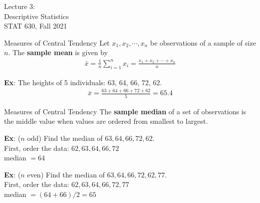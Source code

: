 \documentclass{beamer}
\begin{document}
\begin{frame}
\large
Lecture 3:\\
Descriptive Statistics\\
STAT 630, Fall 2021
\normalsize
\end{frame}

\begin{frame}{Measures of Central Tendency}
Let $x_1, x_2, \cdots, x_n$ be observations of a sample of size $n$.  The \textbf{sample mean} is given by 
\begin{align*}
\bar{x} = \frac{1}{n}\sum_{i=1}^n x_i = \frac{x_1 + x_2 + \cdots + x_n}{n}
\end{align*}

\vspace{15pt}
\textbf{Ex}: The heights of 5 individuals: 63, 64, 66, 72, 62. 
\begin{align*}
\bar{x} = \frac{63 + 64 + 66 + 72 + 62}{5} = 65.4
\end{align*}
\end{frame}

\begin{frame}{Measures of Central Tendency}
The \textbf{sample median} of a set of observations is the middle value when values are ordered from smallest to largest.\\
\vspace{15pt}

\textbf{Ex}: ($n$ odd) Find the median of $63, 64, 66, 72, 62$.\\
\medskip
{\color{blue}
First, order the data: $62, 63, 64, 66, 72$\\
median $= 64$\\
}
\vspace{10pt}

\textbf{Ex}: ($n$ even) Find the median of $63, 64, 66, 72, 62, 77$.\\
\medskip
{\color{blue}
First, order the data: $62, 63, 64, 66, 72, 77$\\
median $= (64+66)/2 = 65$\\
}
\end{frame}
\end{document}
